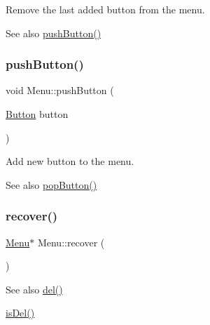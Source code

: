 Remove the last added button from the menu. 

\begin{DoxySeeAlso}{See also}
\mbox{\hyperlink{class_menu_aec502b8f392fd6c88078f95522d9b50d}{push\+Button()}} 
\end{DoxySeeAlso}
\mbox{\label{class_menu_aec502b8f392fd6c88078f95522d9b50d}} 
\subsubsection{\texorpdfstring{push\+Button()}{pushButton()}}
{\footnotesize\ttfamily void Menu\+::push\+Button (\begin{DoxyParamCaption}\item[{\mbox{\hyperlink{class_button}{Button}}}]{button }\end{DoxyParamCaption})\hspace{0.3cm}{\ttfamily [inline]}}



Add new button to the menu. 

\begin{DoxySeeAlso}{See also}
\mbox{\hyperlink{class_menu_a674cd38ddc325b22ec9364e7f83f0b6d}{pop\+Button()}} 
\end{DoxySeeAlso}
\mbox{\label{class_menu_a75a1e9e303a0d8398b6cfc498a92ed48}} 
\subsubsection{\texorpdfstring{recover()}{recover()}}
{\footnotesize\ttfamily \mbox{\hyperlink{class_menu}{Menu}}$\ast$ Menu\+::recover (\begin{DoxyParamCaption}{ }\end{DoxyParamCaption})\hspace{0.3cm}{\ttfamily [inline]}}

\begin{DoxySeeAlso}{See also}
\mbox{\hyperlink{class_menu_a51548806948f9617dc6b66080eec0ca5}{del()}} 

\mbox{\hyperlink{class_menu_a8dd5bf7c984e940e18688fc2d21a7697}{is\+Del()}} 
\end{DoxySeeAlso}
\mbox{\label{class_menu_a8363935442e9c88e1e613e3cd8824654}} 
